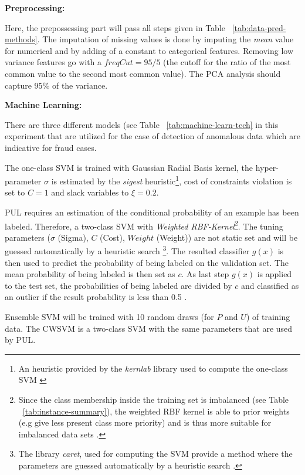 \textbf{Preprocessing:}

Here, the prepossessing part will pass all steps given in Table ~\ref{tab:data-pred-methods}. The imputation of missing values is done by imputing the \textit{mean} value for numerical and by adding of a constant to categorical features. Removing low variance features go with a \(freqCut = 95/5\) (the cutoff for the ratio of the most common value to the second most common value).
The PCA analysis should capture \(95\%\) of the variance.

\textbf{Machine Learning:}

There are three different models (see Table ~\ref{tab:machine-learn-tech} in this experiment that are utilized for the case of detection of anomalous data which are indicative for fraud cases.

The one-class SVM is trained with Gaussian Radial Basis kernel, the hyper-parameter \(\sigma\) is estimated by the \textit{sigest} heuristic\footnote{An heuristic provided by the \textit{kernlab} library used to compute the one-class SVM \cite{Kernlab}}, cost of constraints violation is set to \(C = 1\) and slack variables to \(\xi = 0.2\).

PUL requires an estimation of the conditional probability of an example has been labeled. Therefore, a two-class SVM with \textit{Weighted RBF-Kernel}\footnote{Since the class membership inside the training set is imbalanced (see Table ~\ref{tab:instance-summary}), the weighted RBF kernel is able to prior weights (e.g give less present class more priority) and is thus more suitable for imbalanced data sets \cite{6351707}.}. The tuning parameters (\(\sigma\) (Sigma), \(C\) (Cost), \(Weight\) (Weight)) are not static set and will be guessed automatically by a heuristic search \footnote{The library \textit{caret}, used for computing the SVM provide a method where the parameters are guessed automatically by a heuristic search \cite{JSSv028i05}.}. The resulted classifier \(g(x)\) is then used to predict the probability of being labeled on the validation set. The mean probability of being labeled is then set as \(c\). As last step \(g(x)\) is applied to the test set, the probabilities of being labeled are divided by \(c\) and classified as an outlier if the result probability is less than 0.5 \cite{Li:2011}. 


Ensemble SVM will be trained with 10 random draws (for \(P\) and \(U\)) of training data. The CWSVM is a two-class SVM with the same parameters that are used by PUL. 




